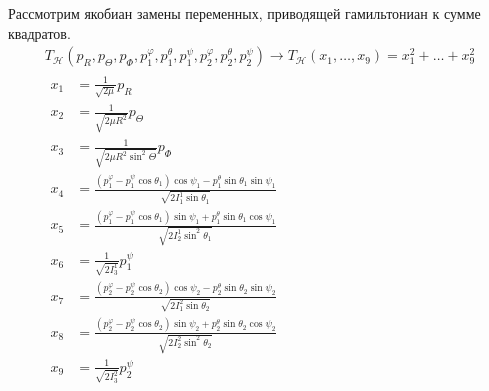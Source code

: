 \documentclass[14pt]{extarticle}
\newcommand{\mH}{\mathcal{H}}
\begin{document}
Рассмотрим якобиан замены переменных, приводящей гамильтониан к сумме квадратов. 
\begin{gather}
	T_\mH(p_R, p_\Theta, p_\Phi, p_1^\varphi, p_1^\theta, p_1^\psi, p_2^\varphi, p_2^\theta, p_2^\psi) \longrightarrow T_\mH(x_1, \dots, x_9) = x_1^2 + \dots + x_9^2 \\
	\begin{aligned}
		x_1 &= \frac{1}{\sqrt{2 \mu}} p_R \\
		x_2 &= \frac{1}{\sqrt{2 \mu R^2}} p_\Theta \\
		x_3 &= \frac{1}{\sqrt{2 \mu R^2 \sin^2 \Theta}} p_\Phi \\
		x_4 &= \frac{(p_1^\varphi - p_1^\psi \cos \theta_1) \cos \psi_1 - p_1^\theta \sin \theta_1 \sin \psi_1}{\sqrt{2 I_1^1 \sin \theta_1}} \\
		x_5 &= \frac{(p_1^\varphi - p_1^\psi \cos \theta_1) \sin \psi_1 + p_1^\theta \sin \theta_1 \cos \psi_1}{\sqrt{2 I_2^1 \sin^2 \theta_1}} \\
		x_6 &= \frac{1}{\sqrt{2 I_3^1}} p_1^\psi \\
		x_7 &= \frac{(p_2^\varphi - p_2^\psi \cos \theta_2) \cos \psi_2 - p_2^\theta \sin \theta_2 \sin \psi_2}{\sqrt{2 I_1^2 \sin \theta_2}} \\
		x_8 &= \frac{(p_2^\varphi - p_2^\psi \cos \theta_2) \sin \psi_2 + p_2^\theta \sin \theta_2 \cos \psi_2}{\sqrt{2 I_2^2 \sin^2 \theta_2}} \\
		x_9 &= \frac{1}{\sqrt{2 I_3^2}} p_2^\psi
	\end{aligned} 
\end{gather}
\end{document}
